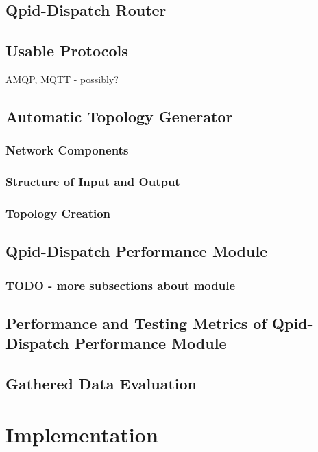 \section{Qpid-Dispatch Router}

\section{Usable Protocols}
AMQP, MQTT - possibly?

\section{Automatic Topology Generator}

\subsection{Network Components}

\subsection{Structure of Input and Output}

\subsection{Topology Creation}

\section{Qpid-Dispatch Performance Module}

\subsection{TODO - more subsections about module}

\section{Performance and Testing Metrics of Qpid-Dispatch Performance Module}

\section{Gathered Data Evaluation}

\chapter{Implementation}
\label{Implementation}

